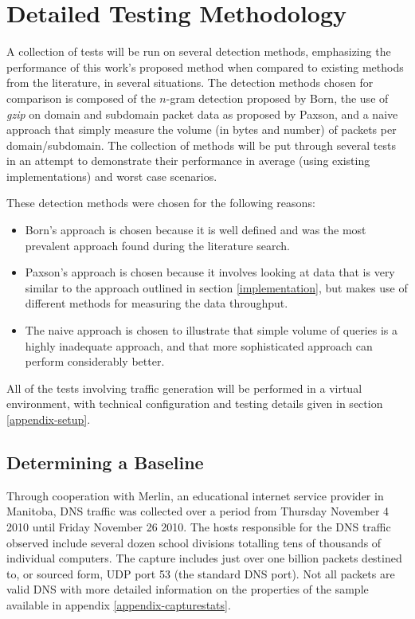 \documentclass[12pt]{report}
\theoremstyle{remark}
\theoremstyle{definition}
\theoremstyle{definition}
\theoremstyle{definition}
\begin{document}
\section{Detailed Testing Methodology}
A collection of tests will be run on
several detection methods, emphasizing the performance of this work's proposed
method when compared to existing methods from the literature, in several
situations. The detection methods chosen for comparison is composed of the
$n$-gram detection proposed by Born\cite{Born2010.cfa}, the use of \emph{gzip}
on domain and subdomain packet data as proposed by Paxson\cite{Paxson2011}, and
a naive approach that simply measure the volume (in bytes and number) of packets
per domain/subdomain. The collection of methods will be put through several
tests in an attempt to demonstrate their performance in average (using existing
implementations) and worst case scenarios.

These detection methods were chosen for the following reasons:

\begin{itemize}
\item Born's approach is chosen because it is well defined and
was the most prevalent approach found during the literature search.

\item Paxson's approach is chosen because it involves looking at data that is very
similar to the approach outlined in section \ref{implementation}, but makes use
of different methods for measuring the data throughput.

\item The naive approach
is chosen to illustrate that simple volume of queries is a highly inadequate
approach, and that more sophisticated approach can perform considerably better.
\end{itemize}

All of the tests involving traffic generation will be performed in a virtual
environment, with technical configuration and testing details given in section
\ref{appendix-setup}.

\subsection{Determining a Baseline}
\label{baseline}
Through cooperation
with Merlin, an educational internet service provider in Manitoba, DNS traffic
was collected over a period from Thursday November 4 2010 until Friday November
26 2010. The hosts responsible for the DNS
traffic observed include several dozen school divisions totalling tens of
thousands of individual computers. The capture includes just over one billion
packets destined to, or sourced form, UDP port 53 (the standard DNS port). Not
all packets are valid DNS with more detailed information on the properties of
the sample available in appendix \ref{appendix-capturestats}.
\end{document}
